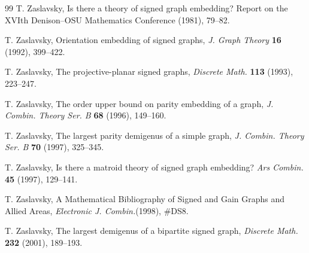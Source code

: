 \documentclass[12pt]{article}
\theoremstyle{definition}
\begin{document}
\begin{thebibliography}{99}
T. Zaslavsky,
Is there a theory of signed graph embedding?
Report on the XVIth Denison--OSU Mathematics Conference (1981), 79--82.


T. Zaslavsky,
Orientation embedding of signed graphs,
\emph{J. Graph Theory} \textbf{16} (1992), 399--422.

T. Zaslavsky,
The projective-planar signed graphs,
\emph{Discrete Math.} \textbf{113} (1993), 223--247.

T. Zaslavsky,
The order upper bound on parity embedding of a graph,
\emph{J. Combin. Theory Ser. B} \textbf{68} (1996), 149--160.

T. Zaslavsky,
The largest parity demigenus of a simple graph,
\emph{J. Combin. Theory Ser. B} \textbf{70} (1997), 325--345.

 T. Zaslavsky, Is there a matroid theory of signed graph embedding?  \emph{Ars Combin.} {\bf 45} (1997), 129--141.

T. Zaslavsky,
A Mathematical Bibliography of Signed and Gain Graphs
and Allied Areas, \emph{Electronic J. Combin.}(1998), \#DS8.

 T. Zaslavsky,
The largest demigenus of a bipartite signed graph,
\emph{Discrete Math.} \textbf{232} (2001), 189--193.



\end{thebibliography}
\end{document}
